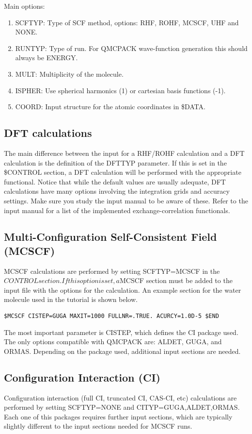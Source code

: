 Main options:
\begin{enumerate}
  \item{SCFTYP: Type of SCF method, options: RHF, ROHF, MCSCF, UHF and NONE.}
  \item{RUNTYP: Type of run. For QMCPACK wave-function generation this should always be ENERGY.}
  \item{MULT: Multiplicity of the molecule.}
  \item{ISPHER: Use spherical harmonics (1) or cartesian basis functions (-1).}
  \item{COORD: Input structure for the atomic coordinates in \$DATA.}
\end{enumerate}


\subsection{DFT calculations}
The main difference between the input for a RHF/ROHF calculation and a DFT calculation 
is the definition of the DFTTYP parameter. If this is set in the \$CONTROL
section, a DFT calculation will be performed with the appropriate functional. Notice that
while the default values are usually adequate, DFT calculations have many options involving
the integration grids and accuracy settings. Make sure you study the input manual to be
aware of these. Refer to the input manual for a list of the implemented exchange-correlation
functionals.


\subsection{Multi-Configuration Self-Consistent Field (MCSCF)}
MCSCF calculations are performed by setting SCFTYP=MCSCF in the $CONTROL
section. If this option is set, a $MCSCF section must be added to the input file with the
options for the calculation. An example section for the water molecule used in the tutorial
is shown below.

\begin{lstlisting}
$MCSCF CISTEP=GUGA MAXIT=1000 FULLNR=.TRUE. ACURCY=1.0D-5 $END
\end{lstlisting}

The most important parameter is CISTEP, which defines the CI package used. The only
options compatible with QMCPACK are: ALDET, GUGA, and ORMAS. Depending on the
package used, additional input sections are needed.


\subsection{Configuration Interaction (CI)}
Configuration interaction (full CI, truncated CI, CAS-CI, etc) calculations are performed
by setting SCFTYP=NONE and CITYP=GUGA,ALDET,ORMAS. Each one of this packages 
requires further input sections, which are typically slightly different to the input sections
needed for MCSCF runs.


